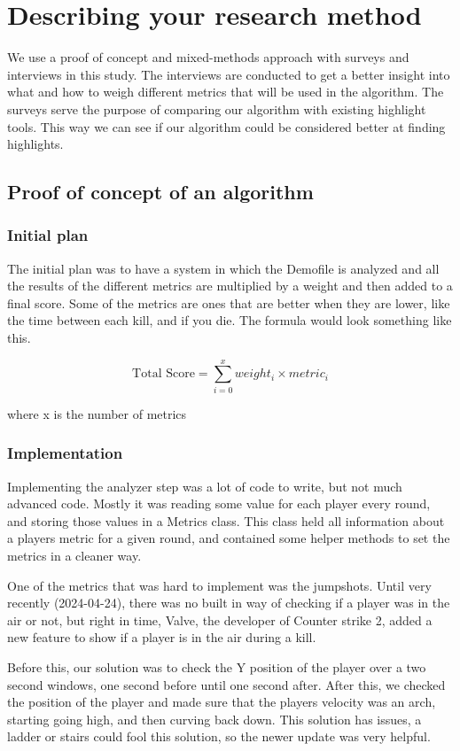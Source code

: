 \section{Describing your research method}
We use a proof of concept and mixed-methods approach with surveys and interviews in this study. The interviews are conducted to get a better insight into what and how to weigh different metrics that will be used in the algorithm. The surveys serve the purpose of comparing our algorithm with existing highlight tools. This way we can see if our algorithm could be considered better at finding highlights.
\subsection{Proof of concept of an algorithm}
\subsubsection{Initial plan}
The initial plan was to have a system in which the \gls{Demofile} is analyzed and all the results of the different metrics are multiplied by a weight and then added to a final score. Some of the metrics are ones that are better when they are lower, like the time between each kill, and if you die. The formula would look something like this.

$$\text{Total Score} = \sum_{i=0}^{x} weight_i \times metric_i $$

where x is the number of metrics

\subsubsection{Implementation}

Implementing the analyzer step was a lot of code to write, but not much advanced code. Mostly it was reading some value for each player every round, and storing those values in a Metrics class. This class held all information about a players metric for a given round, and contained some helper methods to set the metrics in a cleaner way.

One of the metrics that was hard to implement was the \gls{jumpshot}s. Until very recently (2024-04-24), there was no built in way of checking if a player was in the air or not, but right in time, Valve, the developer of Counter strike 2, added a new feature\cite{onTheOtherHandReleaseNotes} to show if a player is in the air during a kill.

Before this, our solution was to check the Y position of the player over a two second windows, one second before until one second after. After this, we checked the position of the player and made sure that the players velocity was an arch, starting going high, and then curving back down. This solution has issues, a ladder or stairs could fool this solution, so the newer update was very helpful.


